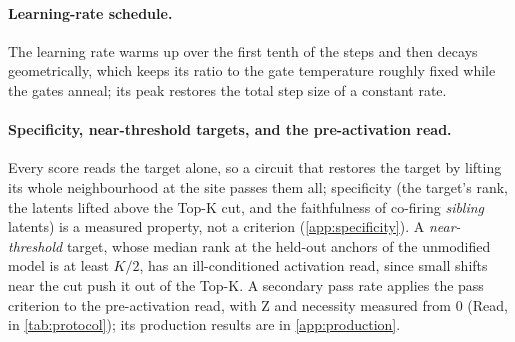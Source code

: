 \documentclass[10pt]{article}
\begin{document}
\paragraph{Learning-rate schedule.}
The learning rate warms up over the first tenth of the steps and then decays geometrically, which keeps its ratio to the gate temperature roughly fixed while the gates anneal; its peak restores the total step size of a constant rate.

\paragraph{Specificity, near-threshold targets, and the pre-activation read.}
Every score reads the target alone, so a circuit that restores the target by lifting its whole neighbourhood at the site passes them all; specificity (the target's rank, the latents lifted above the Top-K cut, and the faithfulness of co-firing \emph{sibling} latents) is a measured property, not a criterion (\cref{app:specificity}).
A \emph{near-threshold} target, whose median rank at the held-out anchors of the unmodified model is at least $K/2$, has an ill-conditioned activation read, since small shifts near the cut push it out of the Top-K.
A secondary pass rate applies the pass criterion to the pre-activation read, with Z and necessity measured from $0$ (Read, in \cref{tab:protocol}); its production results are in \cref{app:production}.
\end{document}
